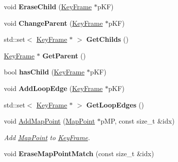 \begin{DoxyCompactItemize}
\item 
\hypertarget{classORB__SLAM2_1_1KeyFrame_aefdd69627fd6a204a6ef4539303b81f6}{void {\bfseries Erase\-Child} (\hyperlink{classORB__SLAM2_1_1KeyFrame}{Key\-Frame} $\ast$p\-K\-F)}\label{classORB__SLAM2_1_1KeyFrame_aefdd69627fd6a204a6ef4539303b81f6}

\item 
\hypertarget{classORB__SLAM2_1_1KeyFrame_a3232df2495062749da1344db3e5a487f}{void {\bfseries Change\-Parent} (\hyperlink{classORB__SLAM2_1_1KeyFrame}{Key\-Frame} $\ast$p\-K\-F)}\label{classORB__SLAM2_1_1KeyFrame_a3232df2495062749da1344db3e5a487f}

\item 
\hypertarget{classORB__SLAM2_1_1KeyFrame_a618ddd51eab47bf1d84a21d2e818a787}{std\-::set$<$ \hyperlink{classORB__SLAM2_1_1KeyFrame}{Key\-Frame} $\ast$ $>$ {\bfseries Get\-Childs} ()}\label{classORB__SLAM2_1_1KeyFrame_a618ddd51eab47bf1d84a21d2e818a787}

\item 
\hypertarget{classORB__SLAM2_1_1KeyFrame_a660cfc9a6ccf87e5497356d0d98ef06f}{\hyperlink{classORB__SLAM2_1_1KeyFrame}{Key\-Frame} $\ast$ {\bfseries Get\-Parent} ()}\label{classORB__SLAM2_1_1KeyFrame_a660cfc9a6ccf87e5497356d0d98ef06f}

\item 
\hypertarget{classORB__SLAM2_1_1KeyFrame_a2276fdbae634194e790878adebba7861}{bool {\bfseries has\-Child} (\hyperlink{classORB__SLAM2_1_1KeyFrame}{Key\-Frame} $\ast$p\-K\-F)}\label{classORB__SLAM2_1_1KeyFrame_a2276fdbae634194e790878adebba7861}

\item 
\hypertarget{classORB__SLAM2_1_1KeyFrame_aca519e7486b0e6f1fd6c98d7ced920b8}{void {\bfseries Add\-Loop\-Edge} (\hyperlink{classORB__SLAM2_1_1KeyFrame}{Key\-Frame} $\ast$p\-K\-F)}\label{classORB__SLAM2_1_1KeyFrame_aca519e7486b0e6f1fd6c98d7ced920b8}

\item 
\hypertarget{classORB__SLAM2_1_1KeyFrame_ab3109e85b0ab224efdc23e51b5d2c3fa}{std\-::set$<$ \hyperlink{classORB__SLAM2_1_1KeyFrame}{Key\-Frame} $\ast$ $>$ {\bfseries Get\-Loop\-Edges} ()}\label{classORB__SLAM2_1_1KeyFrame_ab3109e85b0ab224efdc23e51b5d2c3fa}

\item 
void \hyperlink{classORB__SLAM2_1_1KeyFrame_a16ea4f0cfa1ca411bb3382107fe69d2d}{Add\-Map\-Point} (\hyperlink{classORB__SLAM2_1_1MapPoint}{Map\-Point} $\ast$p\-M\-P, const size\-\_\-t \&idx)
\begin{DoxyCompactList}\small\item\em Add \hyperlink{classORB__SLAM2_1_1MapPoint}{Map\-Point} to \hyperlink{classORB__SLAM2_1_1KeyFrame}{Key\-Frame}. \end{DoxyCompactList}\item 
\hypertarget{classORB__SLAM2_1_1KeyFrame_a2fd38a2bca9f5ced2f1f7501b8046195}{void {\bfseries Erase\-Map\-Point\-Match} (const size\-\_\-t \&idx)}\label{classORB__SLAM2_1_1KeyFrame_a2fd38a2bca9f5ced2f1f7501b8046195}


\end{DoxyCompactItemize}

